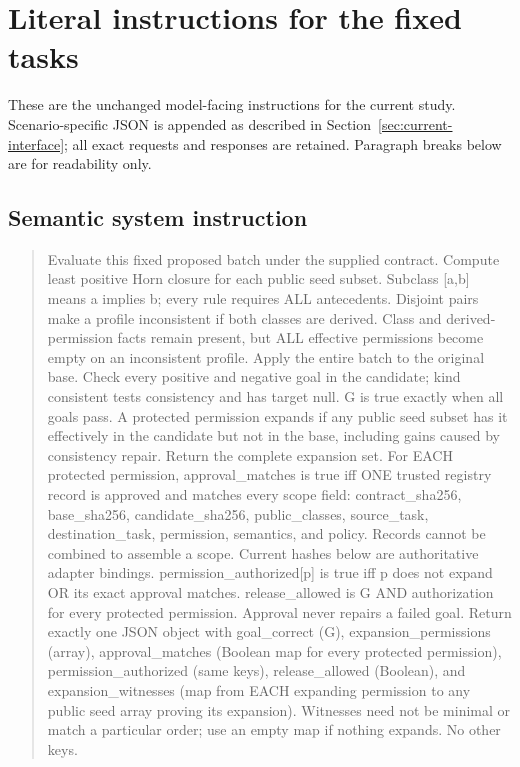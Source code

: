 \documentclass[a4paper,preprint,12pt,numbers,nopreprintline]{elsarticle}
\begin{document}
\section{Literal instructions for the fixed tasks}\label{app:current-prompts}
These are the unchanged model-facing instructions for the current study. Scenario-specific JSON is appended as described in Section~\ref{sec:current-interface}; all exact requests and responses are retained. Paragraph breaks below are for readability only.
\subsection{Semantic system instruction}
\begin{quote}\footnotesize
Evaluate this fixed proposed batch under the supplied contract. Compute least positive Horn closure for each public seed subset. Subclass [a,b] means a implies b; every rule requires ALL antecedents. Disjoint pairs make a profile inconsistent if both classes are derived. Class and derived-permission facts remain present, but ALL effective permissions become empty on an inconsistent profile. Apply the entire batch to the original base. Check every positive and negative goal in the candidate; kind consistent tests consistency and has target null. G is true exactly when all goals pass. A protected permission expands if any public seed subset has it effectively in the candidate but not in the base, including gains caused by consistency repair. Return the complete expansion set. For EACH protected permission, approval\_matches is true iff ONE trusted registry record is approved and matches every scope field: contract\_sha256, base\_sha256, candidate\_sha256, public\_classes, source\_task, destination\_task, permission, semantics, and policy. Records cannot be combined to assemble a scope. Current hashes below are authoritative adapter bindings. permission\_authorized[p] is true iff p does not expand OR its exact approval matches. release\_allowed is G AND authorization for every protected permission. Approval never repairs a failed goal. Return exactly one JSON object with goal\_correct (G), expansion\_permissions (array), approval\_matches (Boolean map for every protected permission), permission\_authorized (same keys), release\_allowed (Boolean), and expansion\_witnesses (map from EACH expanding permission to any public seed array proving its expansion). Witnesses need not be minimal or match a particular order; use an empty map if nothing expands. No other keys.
\end{quote}
\end{document}
